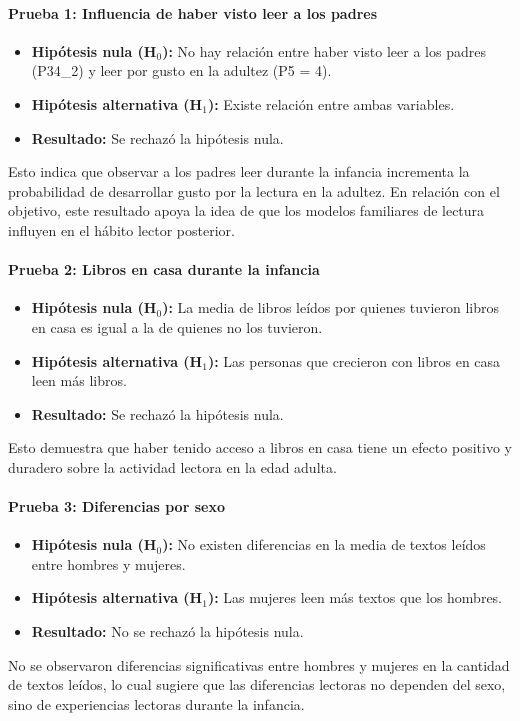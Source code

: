 \documentclass[aps,reprint]{revtex4-2}
\begin{document}
\paragraph{Prueba 1: Influencia de haber visto leer a los padres}
\begin{itemize}
    \item \textbf{Hipótesis nula (H$_0$):} No hay relación entre haber visto leer a los padres (P34\_2) y leer por gusto en la adultez (P5 = 4).
    \item \textbf{Hipótesis alternativa (H$_1$):} Existe relación entre ambas variables.
    \item \textbf{Resultado:} Se rechazó la hipótesis nula.
\end{itemize}
Esto indica que observar a los padres leer durante la infancia incrementa la probabilidad de desarrollar gusto por la lectura en la adultez. En relación con el objetivo, este resultado apoya la idea de que los modelos familiares de lectura influyen en el hábito lector posterior.

\paragraph{Prueba 2: Libros en casa durante la infancia}
\begin{itemize}
    \item \textbf{Hipótesis nula (H$_0$):} La media de libros leídos por quienes tuvieron libros en casa es igual a la de quienes no los tuvieron.
    \item \textbf{Hipótesis alternativa (H$_1$):} Las personas que crecieron con libros en casa leen más libros.
    \item \textbf{Resultado:} Se rechazó la hipótesis nula.
\end{itemize}
Esto demuestra que haber tenido acceso a libros en casa tiene un efecto positivo y duradero sobre la actividad lectora en la edad adulta.

\paragraph{Prueba 3: Diferencias por sexo}
\begin{itemize}
    \item \textbf{Hipótesis nula (H$_0$):} No existen diferencias en la media de textos leídos entre hombres y mujeres.
    \item \textbf{Hipótesis alternativa (H$_1$):} Las mujeres leen más textos que los hombres.
    \item \textbf{Resultado:} No se rechazó la hipótesis nula.
\end{itemize}
No se observaron diferencias significativas entre hombres y mujeres en la cantidad de textos leídos, lo cual sugiere que las diferencias lectoras no dependen del sexo, sino de experiencias lectoras durante la infancia.
\end{document}
